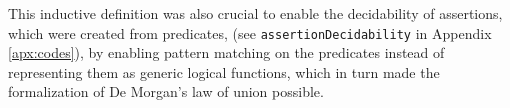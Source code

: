\begin{itemize}
    This inductive definition was also crucial to enable the decidability of assertions, which were created from predicates, (see \verb|assertionDecidability| in Appendix \ref{apx:codes}), by enabling pattern matching on the predicates instead of representing them as generic logical functions, which in turn made the formalization of De Morgan's law of union possible.
    \begin{code}
        \>[2]\AgdaSpace{}%
        \AgdaSpace{}%
        \AgdaSymbol{:}\AgdaSpace{}%
        \AgdaSpace{}%
        \<%
        \\
        \>[2][@{}l@{\AgdaIndent{0}}]%
        \>[4]\AgdaSpace{}%
        \AgdaSymbol{:}\AgdaSpace{}%
        \AgdaSpace{}\<%
        \\
        \>[4]\AgdaSpace{}%
        \AgdaSymbol{:}\AgdaSpace{}%
        \AgdaSpace{}\<%
        \\
        \>[4]\AgdaSpace{}%
        \AgdaSymbol{:}\AgdaSpace{}%
        \AgdaSpace{}%
        \AgdaSpace{}%
        \AgdaSpace{}\<%
        \\
        \>[4]\AgdaSpace{}%
        \AgdaSymbol{:}\AgdaSpace{}%
        \AgdaSpace{}%
        \AgdaSpace{}%
        \AgdaSpace{}%
        \AgdaSpace{}%
        \AgdaSpace{}\<%
        \\
        \>[4]\AgdaSpace{}%
        \AgdaSymbol{:}\AgdaSpace{}%
        \AgdaSpace{}%
        \AgdaSpace{}%
        \AgdaSpace{}%
        \AgdaSpace{}%
        \AgdaSpace{}\<%
        \\
        \\[\AgdaEmptyExtraSkip]%
        \>[4]\AgdaSpace{}%
        \AgdaSymbol{:}\AgdaSpace{}%
        \AgdaSymbol{\{}\AgdaSpace{}%
        \AgdaSymbol{:}\AgdaSpace{}%

\end{code}
\end{itemize}

